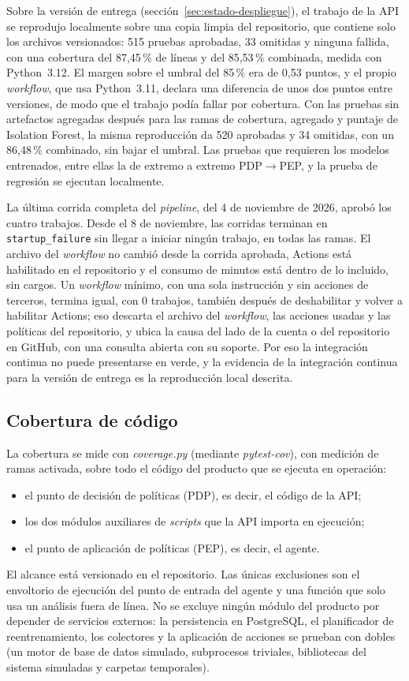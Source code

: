 Sobre la versión de entrega (sección~\ref{sec:estado-despliegue}), el trabajo de la API se reprodujo localmente sobre una copia limpia del repositorio, que contiene solo los archivos versionados: 515 pruebas aprobadas, 33 omitidas y ninguna fallida, con una cobertura del 87,45\,\% de líneas y del 85,53\,\% combinada, medida con Python~3.12. El margen sobre el umbral del 85\,\% era de 0,53 puntos, y el propio \emph{workflow}, que usa Python~3.11, declara una diferencia de unos dos puntos entre versiones, de modo que el trabajo podía fallar por cobertura. Con las pruebas sin artefactos agregadas después para las ramas de cobertura, agregado y puntaje de Isolation Forest, la misma reproducción da 520 aprobadas y 34 omitidas, con un 86,48\,\% combinado, sin bajar el umbral. Las pruebas que requieren los modelos entrenados, entre ellas la de extremo a extremo PDP$\rightarrow$PEP, y la prueba de regresión se ejecutan localmente.

La última corrida completa del \emph{pipeline}, del 4 de noviembre de 2026, aprobó los cuatro trabajos. Desde el 8 de noviembre, las corridas terminan en \texttt{startup\_failure} sin llegar a iniciar ningún trabajo, en todas las ramas. El archivo del \emph{workflow} no cambió desde la corrida aprobada, Actions está habilitado en el repositorio y el consumo de minutos está dentro de lo incluido, sin cargos. Un \emph{workflow} mínimo, con una sola instrucción y sin acciones de terceros, termina igual, con 0 trabajos, también después de deshabilitar y volver a habilitar Actions; eso descarta el archivo del \emph{workflow}, las acciones usadas y las políticas del repositorio, y ubica la causa del lado de la cuenta o del repositorio en GitHub, con una consulta abierta con su soporte. Por eso la integración continua no puede presentarse en verde, y la evidencia de la integración continua para la versión de entrega es la reproducción local descrita.

\subsection{Cobertura de código}
\label{sec:cobertura-codigo}
La cobertura se mide con \emph{coverage.py} (mediante \emph{pytest-cov}), con medición de ramas activada, sobre todo el código del producto que se ejecuta en operación:
\begin{itemize}
	\item el punto de decisión de políticas (PDP), es decir, el código de la API;
	\item los dos módulos auxiliares de \emph{scripts} que la API importa en ejecución;
	\item el punto de aplicación de políticas (PEP), es decir, el agente.
\end{itemize}
El alcance está versionado en el repositorio. Las únicas exclusiones son el envoltorio de ejecución del punto de entrada del agente y una función que solo usa un análisis fuera de línea. No se excluye ningún módulo del producto por depender de servicios externos: la persistencia en PostgreSQL, el planificador de reentrenamiento, los colectores y la aplicación de acciones se prueban con dobles (un motor de base de datos simulado, subprocesos triviales, bibliotecas del sistema simuladas y carpetas temporales).

